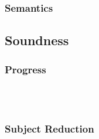 \subsubsection{Semantics}

\subsection{Soundness}
\subsubsection{Progress}\hfill\\\\
\subsubsection{Subject Reduction}
